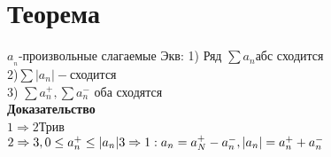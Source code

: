 \documentclass[12pt, a4paper]{article}
\begin{document}
      \section{Теорема}
       $ a__n $-произвольные слагаемые Экв:
       1) Ряд $ \sum a_n  $абс сходится\\
       2)$ \sum |a_n| -$сходится \\
       3) $ \sum a_n^+, \sum a_n^- $ оба сходятся\\
       \textbf{Доказательство}\\
       $ 1\Rightarrow 2 $Трив\\
       $   2\Rightarrow 3 , 0 \leq a_n^+ \leq |a_n| \\
       3\Rightarrow 1 : a_n = a_N^+ - a_n^- , |a_n| = a_n^+ +a_n^- \\
       $
         
        
       

	
	
   
\end{document}
